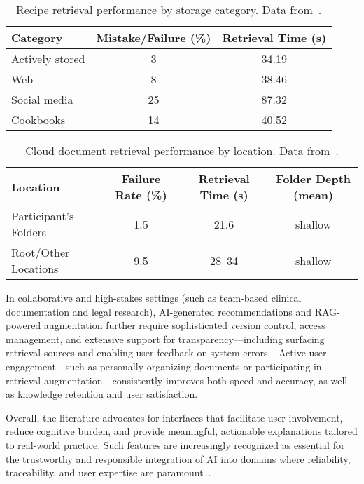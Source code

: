 \documentclass[sigconf]{acmart}
\begin{document}
\begin{table*}[htbp]
\centering
\caption{Recipe retrieval performance by storage category. Data from~\cite{ref39}.}
\label{tab:recipe-retrieval}
\begin{adjustbox}{max width=\textwidth}
\begin{tabular}{@{}lcc@{}}
\toprule
\textbf{Category} & \textbf{Mistake/Failure (\%)} & \textbf{Retrieval Time (s)} \\
\midrule
Actively stored & 3 & 34.19 \\
Web & 8 & 38.46 \\
Social media & 25 & 87.32 \\
Cookbooks & 14 & 40.52 \\
\bottomrule
\end{tabular}
\end{adjustbox}
\end{table*}

\begin{table*}[htbp]
\centering
\caption{Cloud document retrieval performance by location. Data from~\cite{ref40}.}
\label{tab:cloud-retrieval}
\begin{adjustbox}{max width=\textwidth}
\begin{tabular}{@{}lccc@{}}
\toprule
\textbf{Location} & \textbf{Failure Rate (\%)} & \textbf{Retrieval Time (s)} & \textbf{Folder Depth (mean)} \\
\midrule
Participant's Folders & 1.5 & 21.6 & shallow \\
Root/Other Locations & 9.5 & 28--34 & shallow \\
\bottomrule
\end{tabular}
\end{adjustbox}
\end{table*}

In collaborative and high-stakes settings (such as team-based clinical documentation and legal research), AI-generated recommendations and RAG-powered augmentation further require sophisticated version control, access management, and extensive support for transparency—including surfacing retrieval sources and enabling user feedback on system errors~\cite{ref41,ref52,ref53,ref54,ref63,ref64}. Active user engagement—such as personally organizing documents or participating in retrieval augmentation—consistently improves both speed and accuracy, as well as knowledge retention and user satisfaction.

Overall, the literature advocates for interfaces that facilitate user involvement, reduce cognitive burden, and provide meaningful, actionable explanations tailored to real-world practice. Such features are increasingly recognized as essential for the trustworthy and responsible integration of AI into domains where reliability, traceability, and user expertise are paramount~\cite{ref50,ref54,ref55,ref63,ref64}.
\end{document}
